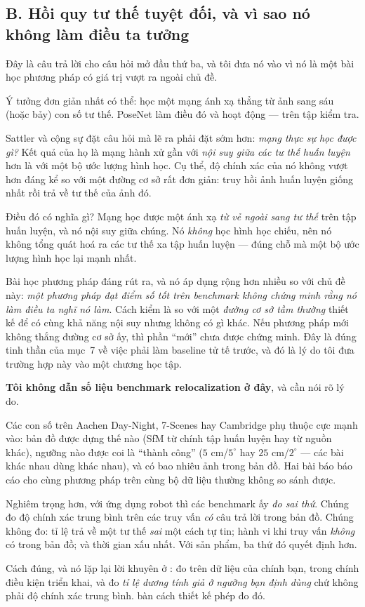 \documentclass[../../vslam.tex]{subfiles}
\begin{document}
\subsection{B. Hồi quy tư thế tuyệt đối, và vì sao nó không làm điều ta tưởng}

Đây là câu trả lời cho câu hỏi mở đầu thứ ba, và tôi đưa nó vào vì nó là một bài học phương pháp có giá trị vượt ra ngoài chủ đề.

Ý tưởng đơn giản nhất có thể: học một mạng ánh xạ thẳng từ ảnh sang sáu (hoặc bảy) con số tư thế. PoseNet \cite{kendall2015posenet} làm điều đó và hoạt động --- trên tập kiểm tra.

Sattler và cộng sự \cite{sattler2019understanding} đặt câu hỏi mà lẽ ra phải đặt sớm hơn: \emph{mạng thực sự học được gì?} Kết quả của họ là mạng hành xử gần với \emph{nội suy giữa các tư thế huấn luyện} hơn là với một bộ ước lượng hình học. Cụ thể, độ chính xác của nó không vượt hơn đáng kể so với một đường cơ sở rất đơn giản: truy hồi ảnh huấn luyện giống nhất rồi trả về tư thế của ảnh đó.

Điều đó có nghĩa gì? Mạng học được một ánh xạ \emph{từ vẻ ngoài sang tư thế} trên tập huấn luyện, và nó nội suy giữa chúng. Nó \emph{không} học hình học chiếu, nên nó không tổng quát hoá ra các tư thế xa tập huấn luyện --- đúng chỗ mà một bộ ước lượng hình học lại mạnh nhất.

Bài học phương pháp đáng rút ra, và nó áp dụng rộng hơn nhiều so với chủ đề này: \emph{một phương pháp đạt điểm số tốt trên benchmark không chứng minh rằng nó làm điều ta nghĩ nó làm}. Cách kiểm là so với một \emph{đường cơ sở tầm thường} thiết kế để có cùng khả năng nội suy nhưng không có gì khác. Nếu phương pháp mới không thắng đường cơ sở ấy, thì phần ``mới'' chưa được chứng minh. Đây là đúng tinh thần của  mục~7 về việc phải làm baseline tử tế trước, và đó là lý do tôi đưa trường hợp này vào một chương học tập.

\begin{cambay}
\textbf{Tôi không dẫn số liệu benchmark relocalization ở đây}, và cần nói rõ lý do.

Các con số trên Aachen Day-Night, 7-Scenes hay Cambridge phụ thuộc cực mạnh vào: bản đồ được dựng thế nào (SfM từ chính tập huấn luyện hay từ nguồn khác), ngưỡng nào được coi là ``thành công'' (\(5\) cm/\(5^\circ\) hay \(25\) cm/\(2^\circ\) --- các bài khác nhau dùng khác nhau), và có bao nhiêu ảnh trong bản đồ. Hai bài báo báo cáo cho cùng phương pháp trên cùng bộ dữ liệu thường không so sánh được.

Nghiêm trọng hơn, với ứng dụng robot thì các benchmark ấy \emph{đo sai thứ}. Chúng đo độ chính xác trung bình trên các truy vấn \emph{có} câu trả lời trong bản đồ. Chúng không đo: tỉ lệ trả về một tư thế \emph{sai} một cách tự tin; hành vi khi truy vấn \emph{không} có trong bản đồ; và thời gian xấu nhất. Với sản phẩm, ba thứ đó quyết định hơn.

Cách đúng, và nó lặp lại lời khuyên ở : đo trên dữ liệu của chính bạn, trong chính điều kiện triển khai, và đo \emph{tỉ lệ dương tính giả ở ngưỡng bạn định dùng} chứ không phải độ chính xác trung bình.  bàn cách thiết kế phép đo đó.
\end{cambay}
\end{document}
